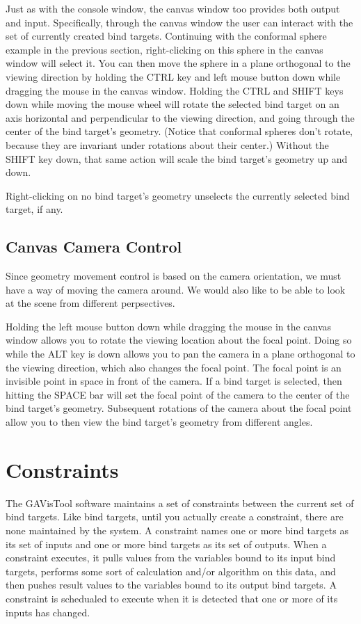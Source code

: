 \documentclass[12pt]{article}
\begin{document}
Just as with the console window, the canvas window too provides both output and input.
Specifically, through the canvas window the user can interact with the set of
currently created bind targets.  Continuing with the conformal sphere example in the
previous section, right-clicking on this sphere in the canvas window will select it.  You can
then move the sphere in a plane orthogonal to the viewing direction by holding the
CTRL key and left mouse button down while dragging the mouse in the canvas window.
Holding the CTRL and SHIFT keys down while moving the mouse wheel will rotate
the selected bind target on an axis horizontal and perpendicular to the viewing direction,
and going through the center of the bind target's geometry.
(Notice that conformal spheres don't rotate, because they are invariant under rotations
about their center.)  Without the SHIFT key down, that same action will scale the
bind target's geometry up and down.

Right-clicking on no bind target's geometry unselects the currently selected bind target, if any.

\subsection{Canvas Camera Control}

Since geometry movement control is based on the camera orientation, we must have a way
of moving the camera around.  We would also like to be able to look at the scene from
different perpsectives.

Holding the left mouse button down while dragging the mouse in the canvas window allows
you to rotate the viewing location about the focal point.  Doing so while the ALT key is down allows you to pan
the camera in a plane orthogonal to the viewing direction, which also changes the focal point.  The focal
point is an invisible point in space in front of the camera.
If a bind target is selected, then hitting the SPACE bar will set the focal point of the camera to the
center of the bind target's geometry.  Subsequent rotations of the camera about the
focal point allow you to then view the bind target's geometry from different angles.

\section{Constraints}

The GAVisTool software maintains a set of constraints between the current
set of bind targets.  Like bind targets, until you actually create a constraint,
there are none maintained by the system.  A constraint names one or more
bind targets as its set of inputs and one or more bind targets as its set of outputs.
When a constraint executes, it pulls values from the variables bound to its
input bind targets, performs some sort of calculation and/or algorithm on this data,
and then pushes result values to the variables bound to its output bind targets.
A constraint is schedualed to execute when it is detected that one or more of
its inputs has changed.
\end{document}
